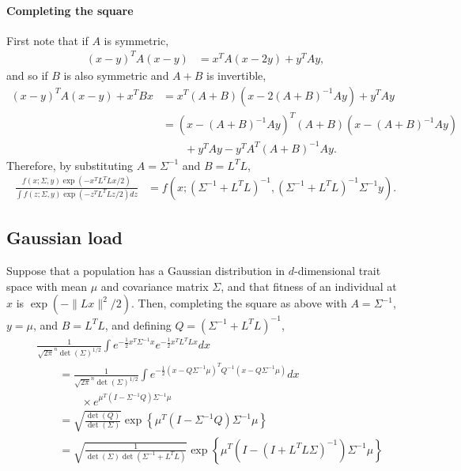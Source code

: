 \documentclass{article}
\newcommand{\1}{\mathbbm{1}}
\begin{document}
\paragraph{Completing the square}
First note that if $A$ is symmetric,
\begin{align*}
    (x-y)^T A (x-y)
    &=
    x^T A \left( x - 2y \right) + y^T A y ,
\end{align*}
and so if $B$ is also symmetric and $A+B$ is invertible,
\begin{align*}
    (x-y)^T A (x-y) + x^T B x
    &=
    x^T (A + B) \left( x - 2 (A + B)^{-1} A y \right) + y^T A y \\
    &=
    \left( x - (A + B)^{-1} A y \right)^T
    (A + B)
    \left( x - (A + B)^{-1} A y \right) \\
    &\qquad{}
    + y^T A y - y^T A^T (A+B)^{-1} A y .
\end{align*}
Therefore, 
by substituting $A=\Sigma^{-1}$ and $B=L^T L$,
\begin{align*}
    \frac{ f(x;\Sigma,y) \exp(-x^T L^T L x / 2)}{\int f(z;\Sigma,y) \exp(-z^T L^T L z / 2) dz}
    &=
    f(x; (\Sigma^{-1} + L^T L)^{-1}, (\Sigma^{-1}+L^T L)^{-1} \Sigma^{-1} y) .
\end{align*}

\subsection{Gaussian load}
\label{apx:gauss_load}

Suppose that a population has a Gaussian distribution in $d$-dimensional trait space
with mean $\mu$ and covariance matrix $\Sigma$,
and that fitness of an individual at $x$ is $\exp(-\|Lx\|^2/2)$.
Then, completing the square as above with $A=\Sigma^{-1}$, $y=\mu$, and $B=L^T L$,
and defining $Q = (\Sigma^{-1} + L^T L)^{-1}$,
\begin{align*}
    &
    \frac{1}{\sqrt{2 \pi}^n \det(\Sigma)^{1/2}} 
        \int e^{-\frac{1}{2} x^T \Sigma^{-1} x} e^{-\frac{1}{2} x^T L^T L x} dx \\
    &\qquad =
    \frac{1}{\sqrt{2 \pi}^n \det(\Sigma)^{1/2}} 
        \int e^{-\frac{1}{2}(x-Q \Sigma^{-1} \mu)^T Q^{-1} (x-Q \Sigma^{-1} \mu)} dx 
        \\ &\qquad \qquad {}
        \times e^{\mu^T \left( I - \Sigma^{-1} Q \right) \Sigma^{-1} \mu} \\
    &\qquad =
    \sqrt{\frac{\det(Q)}{\det(\Sigma)}}
        \exp\left\{\mu^T \left( I - \Sigma^{-1} Q \right) \Sigma^{-1} \mu\right\} \\
    &\qquad =
    \sqrt{\frac{1}{\det(\Sigma)\det(\Sigma^{-1}+L^TL)}}
        \exp\left\{\mu^T \left( I - (I + L^T L \Sigma)^{-1} \right) \Sigma^{-1} \mu\right\} \\
\end{align*}
\end{document}

